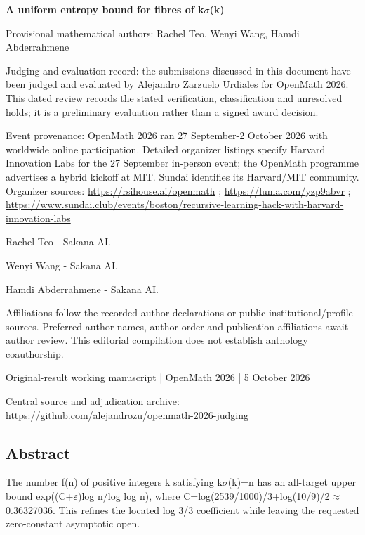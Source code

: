 \documentclass[11pt,a4paper]{article}
\begin{document}
{\LARGE\bfseries A uniform entropy bound for fibres of k\ensuremath{\sigma}(k)\par}\medskip
{\small Provisional mathematical authors: Rachel Teo, Wenyi Wang, Hamdi Abderrahmene\par}\medskip
{\small Judging and evaluation record: the submissions discussed in this document have been judged and evaluated by Alejandro Zarzuelo Urdiales for OpenMath 2026. This dated review records the stated verification, classification and unresolved holds; it is a preliminary evaluation rather than a signed award decision.\par}

{\small Event provenance: OpenMath 2026 ran 27 September-2 October 2026 with worldwide online participation. Detailed organizer listings specify Harvard Innovation Labs for the 27 September in-person event; the OpenMath programme advertises a hybrid kickoff at MIT. Sundai identifies its Harvard/MIT community. Organizer sources: \url{https://rsihouse.ai/openmath} ; \url{https://luma.com/yzp9abvr} ; \url{https://www.sundai.club/events/boston/recursive-learning-hack-with-harvard-innovation-labs}\par}

{\small Rachel Teo  -  Sakana AI.\par}

{\small Wenyi Wang  -  Sakana AI.\par}

{\small Hamdi Abderrahmene  -  Sakana AI.\par}

{\small Affiliations follow the recorded author declarations or public institutional/profile sources. Preferred author names, author order and publication affiliations await author review. This editorial compilation does not establish anthology coauthorship.\par}

{\small Original-result working manuscript | OpenMath 2026 | 5 October 2026\par}\medskip
{\small Central source and adjudication archive: \url{https://github.com/alejandrozu/openmath-2026-judging}\par}

\subsection{Abstract}
The number f(n) of positive integers k satisfying k\ensuremath{\sigma}(k)=n has an all-target upper bound exp((C+\ensuremath{\varepsilon})log n/log log n), where C=log(2539/1000)/3+log(10/9)/2\ensuremath{\approx}0.36327036. This refines the located log 3/3 coefficient while leaving the requested zero-constant asymptotic open.
\end{document}
